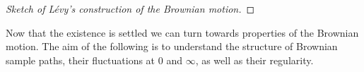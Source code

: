 \begin{proof}[Sketch of L\'evy's construction of the Brownian motion]
\end{proof}
Now that the existence is settled we can turn towards properties of the Brownian motion. The aim of the following is to understand the structure of Brownian sample paths, their fluctuations at $0$ and $\infty$, as well as their regularity.
